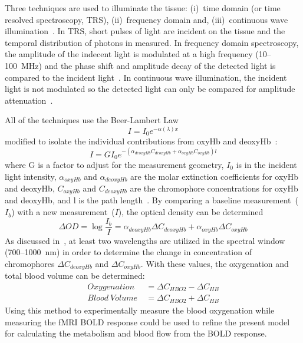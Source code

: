 Three techniques are used to illuminate the tissue: (i)~time domain (or time resolved spectroscopy, TRS), (ii)~frequency domain and, (iii)~continuous wave illumination~\citep{izzetoglu2004}.  In TRS, short pulses of light are incident on the tissue and the temporal distribution of photons in measured.  In frequency domain spectroscopy, the amplitude of the indecent light is modulated at a high frequency (10--100~MHz) and the phase shift and amplitude decay of the detected light is compared to the incident light~\citep{boas2002}. In continuous wave illumination, the incident light is not modulated so the detected light can only be compared for amplitude attenuation~\citep{izzetoglu2004}.

All of the techniques use the Beer-Lambert Law~\citep{beerlambert}
\begin{equation}
  I = I_0 e^{-\alpha (\lambda) x} \label{eq:beerlambert1}
\end{equation} 
modified to isolate the individual contributions from oxyHb and deoxyHb~\citep{cope}:
\begin{equation}
  \label{eq:modifiedbeerlamber}
  I = G I_0 e^{-(\alpha_{deoxyHb}C_{deoxyHb}+\alpha_{oxyHb}C_{oxyHb}) l} 
\end{equation}
where G is a factor to adjust for the measurement geometry, $I_0$ is in the incident light intensity, $\alpha_{oxyHb}$ and $\alpha_{deoxyHb}$ are the molar extinction coefficients for oxyHb and deoxyHb, $C_{oxyHb}$ and $C_{deoxyHb}$ are the chromophore concentrations for oxyHb and deoxyHb, and l is the path length~\citep{izzetoglu2004}.  By comparing a baseline measurement~($I_b$) with a new measurement~($I$), the optical density can be determined~\citep{izzetoglu2004}
\begin{equation}
  \Delta OD = \log \frac{I_b}{I} = \alpha_{deoxyHb} \Delta C_{deoxyHb}+\alpha_{oxyHb} \Delta C_{oxyHb}
\end{equation}
As discussed in~\citet{izzetoglu2004}, at least two wavelengths are utilized in the spectral window (700--1000~nm) in order to determine the change in concentration of chromophores $\Delta C_{deoxyHb}$ and $\Delta C_{oxyHb}$.  With these values, the oxygenation and total blood volume can be determined:
\begin{align}
  \label{eq:o2bloodvolume}
  Oxygenation\ &= \Delta C_{HBO2} - \Delta C_{HB} \nonumber \\
  Blood\ Volume\ &= \Delta C_{HBO2} + \Delta C_{HB} 
\end{align}
Using this method to experimentally measure the blood oxygenation while measuring the fMRI BOLD response could be used to refine the present model for calculating the metabolism and blood flow from the BOLD response.

